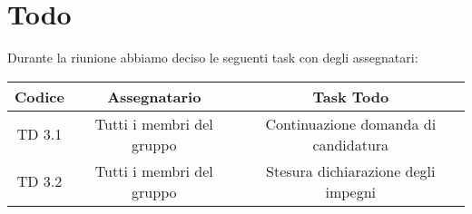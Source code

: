 \section{Todo}

Durante la riunione abbiamo deciso le seguenti task con degli assegnatari:

\vspace{0.5cm}

\begin{table}[htbp]
	\begin{tabular}{|c|c|c|}
		\hline
		\rowcolor[gray]{0.9}
		Codice & Assegnatario & Task Todo \\
		\hline
		TD 3.1 & Tutti i membri del gruppo & Continuazione domanda di candidatura \\
		\hline
		TD 3.2 & Tutti i membri del gruppo & Stesura dichiarazione degli impegni \\
		\hline
	\end{tabular}
\end{table}